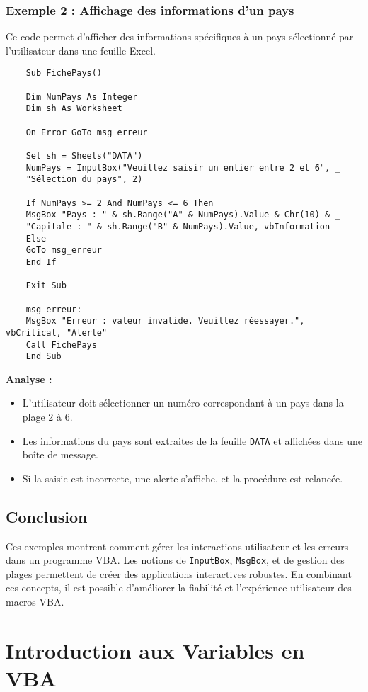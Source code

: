 \documentclass[a4paper,12pt]{report}
\begin{document}
\subsection{Exemple 2 : Affichage des informations d'un pays}

Ce code permet d'afficher des informations spécifiques à un pays sélectionné par l'utilisateur dans une feuille Excel.

\begin{lstlisting}
	Sub FichePays()
	
	Dim NumPays As Integer
	Dim sh As Worksheet
	
	On Error GoTo msg_erreur
	
	Set sh = Sheets("DATA")
	NumPays = InputBox("Veuillez saisir un entier entre 2 et 6", _
	"Sélection du pays", 2)
	
	If NumPays >= 2 And NumPays <= 6 Then
	MsgBox "Pays : " & sh.Range("A" & NumPays).Value & Chr(10) & _
	"Capitale : " & sh.Range("B" & NumPays).Value, vbInformation
	Else
	GoTo msg_erreur
	End If
	
	Exit Sub
	
	msg_erreur:
	MsgBox "Erreur : valeur invalide. Veuillez réessayer.", vbCritical, "Alerte"
	Call FichePays
	End Sub
\end{lstlisting}

\textbf{Analyse :}
\begin{itemize}
	\item L'utilisateur doit sélectionner un numéro correspondant à un pays dans la plage 2 à 6.
	\item Les informations du pays sont extraites de la feuille \texttt{DATA} et affichées dans une boîte de message.
	\item Si la saisie est incorrecte, une alerte s'affiche, et la procédure est relancée.
\end{itemize}

\section{Conclusion}

Ces exemples montrent comment gérer les interactions utilisateur et les erreurs dans un programme VBA. Les notions de \texttt{InputBox}, \texttt{MsgBox}, et de gestion des plages permettent de créer des applications interactives robustes. En combinant ces concepts, il est possible d'améliorer la fiabilité et l'expérience utilisateur des macros VBA.
	
\chapter{Introduction aux Variables en VBA}
\end{document}
